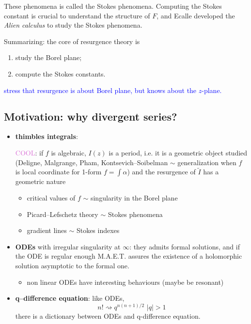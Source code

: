 \documentclass[11pt,a4paper,twoside,leqno,noamsfonts]{amsart}
\numberwithin{equation}{section}
\begin{document}
These phenomena is called the Stokes phenomena. Computing the Stokes constant is crucial to understand the structure of $F$, and Ecalle developed the\textit{ Alien calculus} to study the  Stokes phenomena.   

Summarizing: the core of resurgence theory is 
\begin{enumerate}
\item study the Borel plane;
\item compute the Stokes constants. 
\end{enumerate} 

\textcolor{blue}{stress that resurgence is about Borel plane, but knows about the $z$-plane.}

\subsection{Motivation: why divergent series?}

\begin{itemize}
\item \textbf{thimbles integrals}:

\textcolor{Orchid}{COOL}: if $f$ is algebraic, $I(z)$ is a period, i.e. it is a geometric object studied (Deligne, Malgrange, Pham, Kontsevich--Soibelman $\sim$ generalization when $f$ is local coordinate for 1-form $f=\int \alpha$) and the resurgence of $\tilde{I}$ has a geometric nature 
\begin{itemize}
\item critical values of $f$ $\sim$ singularity in the Borel plane
\item Picard--Lefschetz theory $\sim$ Stokes phenomena
\item gradient lines $\sim$ Stokes indexes
\end{itemize}
\item \textbf{ODEs} with irregular singularity at $\infty$: they admits formal solutions, and if the ODE is regular enough M.A.E.T. assures the existence of a holomorphic solution asymptotic to the formal one. 
\begin{itemize}
\item non linear ODEs have interesting behaviours (maybe be resonant)
\end{itemize}
\item \textbf{q--difference equation}: like ODEs, 
\begin{equation}
n! \rightsquigarrow q^{n(n+1)/2}\,\, |q|>1
\end{equation}
there is a dictionary between ODEs and q-difference equation. 
\end{itemize}
\end{document}
